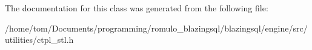 The documentation for this class was generated from the following file\+:\begin{DoxyCompactItemize}
\item 
/home/tom/\+Documents/programming/romulo\+\_\+blazingsql/blazingsql/engine/src/utilities/ctpl\+\_\+stl.\+h\end{DoxyCompactItemize}
